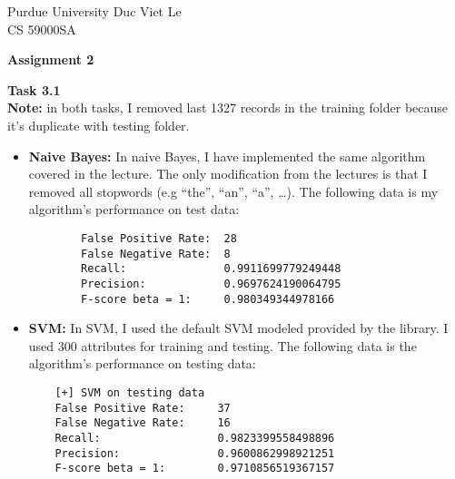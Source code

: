 \documentclass{article}
\newcommand{\dspace}{\baselineskip 16pt}
\newcommand{\sspace}{\baselineskip 14pt}
\newcounter{task}[section]
\begin{document}
\sspace
\noindent
Purdue University \hfill Duc Viet Le\\
CS 59000SA        \hfill 
\dspace
\begin{center}
{\bf Assignment 2}
\end{center}
\vspace{.2in}

\noindent\textbf{Task 3.1}
\\
\textbf{Note:} in both tasks, I removed last 1327 records in the training folder because it's duplicate with testing folder.
\begin{itemize}
	\item 
	\textbf{Naive Bayes:}
	In naive Bayes, I have implemented the same algorithm covered in the lecture. The only modification from the lectures is that I removed all stopwords (e.g ``the'', ``an'', ``a'', \dots). The following data is my algorithm's performance on test data:
	\begin{verbatim}
		False Positive Rate:  28
		False Negative Rate:  8
		Recall:               0.9911699779249448
		Precision:            0.9697624190064795
		F-score beta = 1:     0.980349344978166
	\end{verbatim}

	\item 
	\textbf{SVM:} In SVM, I used the default SVM modeled provided by the library. I used 300 attributes for training and testing. The following data is the algorithm's performance on testing data:
	\begin{verbatim}
	[+] SVM on testing data
	False Positive Rate:     37
	False Negative Rate:     16
	Recall:                  0.9823399558498896
	Precision:               0.9600862998921251
	F-score beta = 1:        0.9710856519367157
	\end{verbatim}
\end{itemize}
\end{document}
